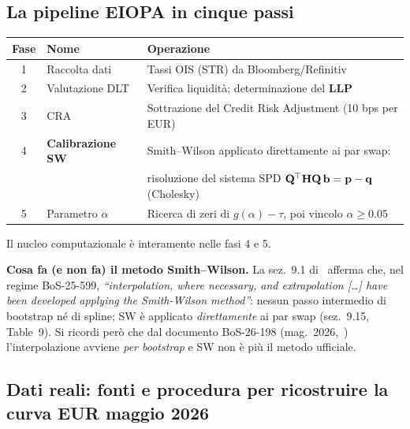 \documentclass[11pt,a4paper]{article}
\theoremstyle{plain}
\theoremstyle{definition}
\theoremstyle{remark}
\newcommand{\bfb}{\mathbf{b}}
\newcommand{\bfp}{\mathbf{p}}
\newcommand{\bfq}{\mathbf{q}}
\newcommand{\Hmat}{\mathbf{H}}
\newcommand{\Qmat}{\mathbf{Q}}
\newcommand{\transp}{^{\mskip-1mu\top}}
\begin{document}
\subsection{La pipeline EIOPA in cinque passi}

\begin{center}\small
\renewcommand{\arraystretch}{1.3}
\begin{tabular}{clp{7.5cm}}
\toprule
\textbf{Fase} & \textbf{Nome} & \textbf{Operazione} \\
\midrule
1 & Raccolta dati & Tassi OIS (\texteuro{}STR) da Bloomberg/Refinitiv \\
2 & Valutazione DLT & Verifica liquidit\`a; determinazione del \textbf{LLP} \\
3 & CRA & Sottrazione del Credit Risk Adjustment (10 bps per EUR) \\
4 & \textbf{Calibrazione SW} & Smith--Wilson applicato direttamente ai par swap: \\
  & & risoluzione del sistema SPD $\Qmat\transp\Hmat\Qmat\,\bfb = \bfp-\bfq$ (Cholesky) \\
5 & Parametro $\alpha$ & Ricerca di zeri di $g(\alpha)-\tau$, poi vincolo $\alpha\ge 0.05$ \\
\bottomrule
\end{tabular}
\end{center}

Il nucleo computazionale \`e interamente nelle fasi 4 e 5.

\begin{warningbox}
\textbf{Cosa fa (e non fa) il metodo Smith--Wilson.}
La sez.~9.1 di~\cite{eiopa2025} afferma che, nel regime BoS-25-599,
\emph{``interpolation, where necessary, and extrapolation [\ldots] have been
developed applying the Smith-Wilson method''}: nessun passo intermedio di bootstrap
né di spline; SW è applicato \emph{direttamente} ai par swap (sez.~9.15, Table~9).
Si ricordi però che dal documento BoS-26-198 (mag.~2026,~\cite{eiopa2026})
l'interpolazione avviene \emph{per bootstrap} e SW non è più il metodo ufficiale.
\end{warningbox}

\subsection{Dati reali: fonti e procedura per ricostruire la curva EUR maggio 2026}
\label{sec:dati_reali}
\end{document}
